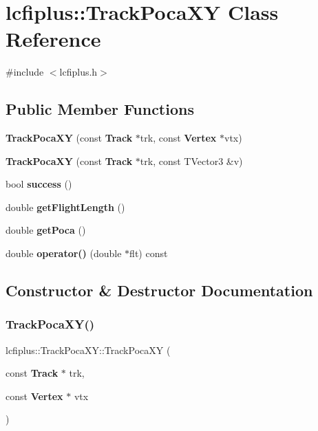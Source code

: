 \section{lcfiplus\+:\+:Track\+Poca\+XY Class Reference}
\label{classlcfiplus_1_1TrackPocaXY}


{\ttfamily \#include $<$lcfiplus.\+h$>$}

\subsection*{Public Member Functions}
\begin{DoxyCompactItemize}
\item 
\textbf{ Track\+Poca\+XY} (const \textbf{ Track} $\ast$trk, const \textbf{ Vertex} $\ast$vtx)
\item 
\textbf{ Track\+Poca\+XY} (const \textbf{ Track} $\ast$trk, const T\+Vector3 \&v)
\item 
bool \textbf{ success} ()
\item 
double \textbf{ get\+Flight\+Length} ()
\item 
double \textbf{ get\+Poca} ()
\item 
double \textbf{ operator()} (double $\ast$flt) const
\end{DoxyCompactItemize}


\subsection{Constructor \& Destructor Documentation}
\mbox{\label{classlcfiplus_1_1TrackPocaXY_a8d8dbcd2b3eda3b34b069ad68281444a}} 
\subsubsection{Track\+Poca\+X\+Y()\hspace{0.1cm}{\footnotesize\ttfamily [1/2]}}
{\footnotesize\ttfamily lcfiplus\+::\+Track\+Poca\+X\+Y\+::\+Track\+Poca\+XY (\begin{DoxyParamCaption}\item[{const \textbf{ Track} $\ast$}]{trk,  }\item[{const \textbf{ Vertex} $\ast$}]{vtx }\end{DoxyParamCaption})}


